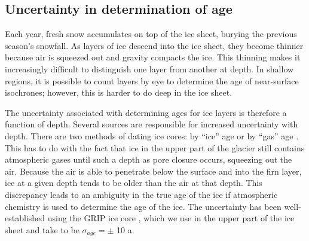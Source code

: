 \documentclass[draft,jgrga]{agutex}
\begin{document}
\begin{article}
\subsection{Uncertainty in determination of age}\label{ageunc}




Each year, fresh snow accumulates on top of the ice sheet, burying the previous season’s snowfall. As layers of ice descend into the ice sheet, they become thinner because air is squeezed out and gravity compacts the ice. This thinning makes it increasingly difficult to distinguish one layer from another at depth. In shallow regions, it is possible to count layers by eye to determine the age of near-surface isochrones; however, this is harder to do deep in the ice sheet.

The uncertainty associated with determining ages for ice layers is therefore a function of depth. Several sources are responsible for increased uncertainty with depth. There are two methods of dating ice cores: by “ice” age or by “gas” age \citep{bender2006}. This has to do with the fact that ice in the upper part of the glacier still contains atmospheric gases until such a depth as pore closure occurs, squeezing out the air. Because the air is able to penetrate below the surface and into the firn layer, ice at a given depth tends to be older than the air at that depth. This discrepancy leads to an ambiguity in the true age of the ice if atmospheric chemistry is used to determine the age of the ice. The uncertainty has been well-established using the GRIP ice core \citep{blunier1998}, which we use in the upper part of the ice sheet and take to be $\sigma_{age} = \pm$ 10 a.


\end{article}
\end{document}
